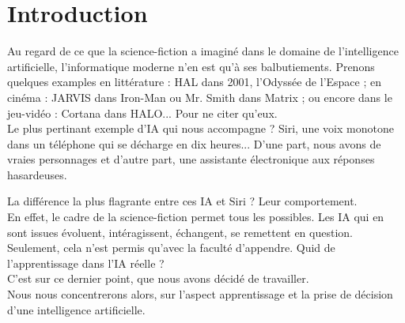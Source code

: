 \documentclass[a4paper]{report}
\begin{document}
  

  \section*{Introduction}
  Au regard de ce que la science-fiction a imaginé dans le domaine de l'intelligence artificielle, l'informatique moderne n'en est qu'à ses balbutiements.
  Prenons quelques examples en littérature : HAL dans 2001, l'Odyssée de l'Espace ;
  en cinéma : JARVIS dans Iron-Man ou Mr. Smith dans Matrix ; ou encore dans le jeu-vidéo : Cortana dans HALO... Pour ne citer qu'eux. \\
  Le plus pertinant exemple d'IA qui nous accompagne ? Siri, une voix monotone dans un téléphone qui se décharge en dix heures...
  D'une part, nous avons de vraies personnages et d'autre part, une assistante électronique aux réponses hasardeuses.

  \noindent
  La différence la plus flagrante entre ces IA et Siri ? Leur comportement. \\
  En effet, le cadre de la science-fiction permet tous les possibles. Les IA qui en sont issues évoluent, intéragissent, échangent, se remettent en question.
  Seulement, cela n'est permis qu'avec la faculté d'appendre. Quid de l'apprentissage dans l'IA réelle ? \\

  \noindent
  C'est sur ce dernier point, que nous avons décidé de travailler. \\
  Nous nous concentrerons alors, sur l'aspect apprentissage et la prise de décision d'une intelligence artificielle.
\end{document}
